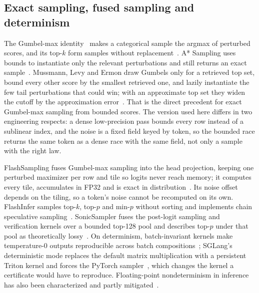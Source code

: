 \subsection{Exact sampling, fused sampling and determinism}\label{sec:prior-sampling}
The Gumbel-max identity~\cite{gumbel1954,papandreou2011} makes a categorical sample the argmax of perturbed scores, and its top-$k$ form samples without replacement~\cite{kool2019}. A* Sampling uses bounds to instantiate only the relevant perturbations and still returns an exact sample~\cite{astar}. Mussmann, Levy and Ermon draw Gumbels only for a retrieved top set, bound every other score by the smallest retrieved one, and lazily instantiate the few tail perturbations that could win; with an approximate top set they widen the cutoff by the approximation error~\cite{mussmann2017,mussmann2016}. That is the direct precedent for exact Gumbel-max sampling from bounded scores. The version used here differs in two engineering respects: a dense low-precision pass bounds every row instead of a sublinear index, and the noise is a fixed field keyed by token, so the bounded race returns the same token as a dense race with the same field, not only a sample with the right law.

FlashSampling fuses Gumbel-max sampling into the head projection, keeping one perturbed maximizer per row and tile so logits never reach memory; it computes every tile, accumulates in FP32 and is exact in distribution~\cite{flashsampling}. Its noise offset depends on the tiling, so a token's noise cannot be recomputed on its own. FlashInfer samples top-$k$, top-$p$ and min-$p$ without sorting and implements chain speculative sampling~\cite{flashinfer,flashinfersamplingblog}. SonicSampler fuses the post-logit sampling and verification kernels over a bounded top-128 pool and describes top-$p$ under that pool as theoretically lossy~\cite{sonic}. On determinism, batch-invariant kernels make temperature-0 outputs reproducible across batch compositions~\cite{he2025nondeterminism}; SGLang's deterministic mode replaces the default matrix multiplication with a persistent Triton kernel and forces the PyTorch sampler~\cite{sglangdeterministic}, which changes the kernel a certificate would have to reproduce. Floating-point nondeterminism in inference has also been characterized and partly mitigated~\cite{yuan2025nondeterminism}.

